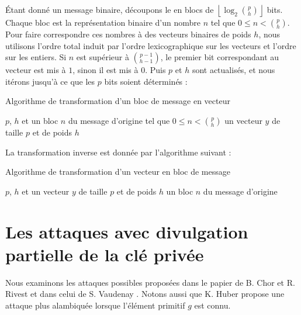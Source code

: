 \documentclass[a4paper, titlepage]{article}
\theoremstyle{definition}
\theoremstyle{remark}
\def\floor #1{\left\lfloor#1\right\rfloor}
\begin{document}
\'Etant donné un message binaire, découpons le en blocs de $\floor{\log_2\binom{p}{h}}$ bits. Chaque bloc est la représentation binaire d'un nombre $n$ tel que $0\leqslant n < \binom{p}{h}$. Pour faire correspondre ces nombres à des vecteurs binaires de poids $h$, nous utilisons l'ordre total induit par l'ordre lexicographique sur les vecteurs et l'ordre sur les entiers. Si $n$ est supérieur à $\binom{p-1}{h-1}$, le premier bit correspondant au vecteur est mis à $1$, sinon il est mis à $0$. Puis $p$ et $h$ sont actualisés, et nous itérons jusqu'à ce que les $p$ bits soient déterminés :

\begin{algorithm}[H]
\caption{Algorithme de transformation d'un bloc de message en vecteur}
\begin{algorithmic}[1]
\REQUIRE $p$, $h$ et un bloc $n$ du message d'origine tel que $0\leqslant n < \binom{p}{h}$
\ENSURE un vecteur $y$ de taille $p$ et de poids $h$
	\ELSE
	\ENDIF
\ENDFOR
{}
\end{algorithmic}
\end{algorithm}

La transformation inverse est donnée par l'algorithme suivant :
\begin{algorithm}[H]
\caption{Algorithme de transformation d'un vecteur en bloc de message}
\begin{algorithmic}[1]
\REQUIRE $p$, $h$ et un vecteur $y$ de taille $p$ et de poids $h$
\ENSURE un bloc $n$ du message d'origine
	\ENDIF
\ENDFOR
{}
\end{algorithmic}
\end{algorithm}


\section{Les attaques avec divulgation partielle de la clé privée}

Nous examinons les attaques possibles proposées dans le papier de B. Chor et R. Rivest \cite[Section VII, A]{chorRivest1988} et dans celui de S. Vaudenay \cite[Section 4]{vaudenay2000}. Notons aussi que K. Huber \cite{huber1991} propose une attaque plus alambiquée lorsque l'élément primitif $g$ est connu.
\end{document}
